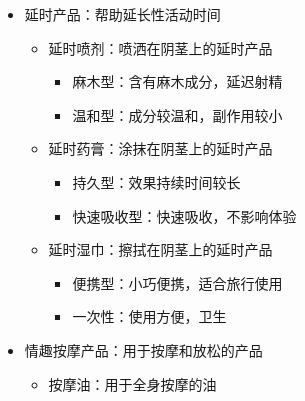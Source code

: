 \documentclass[12pt,UTF8]{ctexbook}
\begin{document}
\begin{itemize}
\begin{itemize}
\begin{itemize}
			\begin{itemize}
				\item 催情香水：添加催情成分的香水
				\item 花香型：带有花香的香水
				\item 木质香型：带有木质香气的香水
			\end{itemize}
			\item 香薰蜡烛：带有香气的蜡烛，增加氛围
			\begin{itemize}
				\item 催情香薰：添加催情成分的香薰
				\item 放松香薰：帮助放松的香薰
			\end{itemize}
			\item 精油：可用于按摩或增加氛围
			\begin{itemize}
				\item 催情精油：如玫瑰精油、依兰精油等
				\item 放松精油：如薰衣草精油、洋甘菊精油等
			\end{itemize}
		\end{itemize}
		\item 延时产品：帮助延长性活动时间
		\begin{itemize}
			\item 延时喷剂：喷洒在阴茎上的延时产品
			\begin{itemize}
				\item 麻木型：含有麻木成分，延迟射精
				\item 温和型：成分较温和，副作用较小
			\end{itemize}
			\item 延时药膏：涂抹在阴茎上的延时产品
			\begin{itemize}
				\item 持久型：效果持续时间较长
				\item 快速吸收型：快速吸收，不影响体验
			\end{itemize}
			\item 延时湿巾：擦拭在阴茎上的延时产品
			\begin{itemize}
				\item 便携型：小巧便携，适合旅行使用
				\item 一次性：使用方便，卫生
			\end{itemize}
		\end{itemize}
		\item 情趣按摩产品：用于按摩和放松的产品
		\begin{itemize}
			\item 按摩油：用于全身按摩的油
			\begin{itemize}

\end{itemize}
\end{itemize}
\end{itemize}
\end{itemize}
\end{document}
